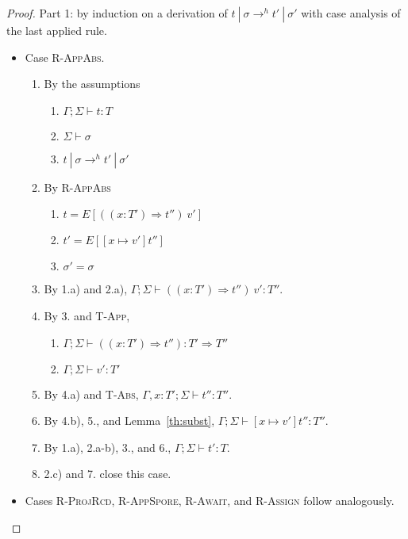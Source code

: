 \begin{proof}

Part 1: by induction on a derivation of $t~|~\sigma \rightarrow^h t'~|~\sigma'$ with case analysis of the last applied rule.

\begin{itemize}
\item Case \textsc{R-AppAbs}.
\begin{enumerate}
\item By the assumptions
  \begin{enumerate}[label=(\alph*)]
  \item $\Gamma ; \Sigma \vdash t : T$
  \item $\Sigma \vdash \sigma$
  \item $t~|~\sigma \rightarrow^h t'~|~\sigma'$
  \end{enumerate}
\item By \textsc{R-AppAbs}
  \begin{enumerate}[label=(\alph*)]
  \item $t = E[((x : T') \Rightarrow t'')~v']$
  \item $t' = E[[x \mapsto v']t'']$
  \item $\sigma' = \sigma$
  \end{enumerate}
\item By 1.a) and 2.a), $\Gamma ; \Sigma \vdash ((x : T') \Rightarrow t'')~v' : T''$.
\item By 3. and \textsc{T-App},
  \begin{enumerate}[label=(\alph*)]
  \item $\Gamma ; \Sigma \vdash ((x : T') \Rightarrow t'') : T' \Rightarrow T''$
  \item $\Gamma ; \Sigma \vdash v' : T'$
  \end{enumerate}
\item By 4.a) and \textsc{T-Abs}, $\Gamma , x : T' ; \Sigma \vdash t'' : T''$.
\item By 4.b), 5., and Lemma~\ref{th:subst}, $\Gamma ; \Sigma \vdash [x \mapsto v']t'' : T''$.
\item By 1.a), 2.a-b), 3., and 6., $\Gamma ; \Sigma \vdash t' : T$.
\item 2.c) and 7. close this case.
\end{enumerate}

\item Cases \textsc{R-ProjRcd}, \textsc{R-AppSpore}, \textsc{R-Await}, and \textsc{R-Assign} follow analogously.


\end{itemize}
\end{proof}
